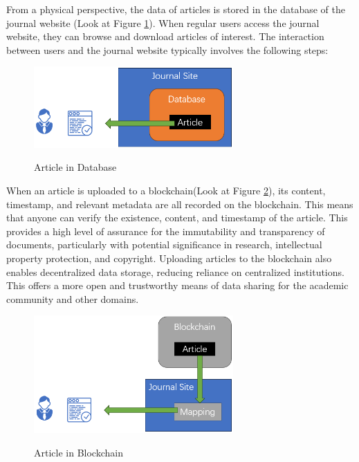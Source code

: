 \documentclass[lettersize,journal]{IEEEtran}
\begin{document}
From a physical perspective, the data of articles is stored in the database of the journal website (Look at Figure \ref{fig:journalsite}). When regular users access the journal website, they can browse and download articles of interest. The interaction between users and the journal website typically involves the following steps:

\begin{figure}[h]
  \centering
  \includegraphics[width=3in]{assets/journalsite.png}
  \label{fig:journalsite}
  \caption{Article in Database}
\end{figure}

When an article is uploaded to a blockchain(Look at Figure \ref{fig:journalchain}), its content, timestamp, and relevant metadata are all recorded on the blockchain. This means that anyone can verify the existence, content, and timestamp of the article. This provides a high level of assurance for the immutability and transparency of documents, particularly with potential significance in research, intellectual property protection, and copyright. Uploading articles to the blockchain also enables decentralized data storage, reducing reliance on centralized institutions. This offers a more open and trustworthy means of data sharing for the academic community and other domains.

\begin{figure}[h]
  \centering
  \includegraphics[width=3in]{assets/journalchain.png}
  \label{fig:journalchain}
  \caption{Article in Blockchain}
\end{figure}
\end{document}
